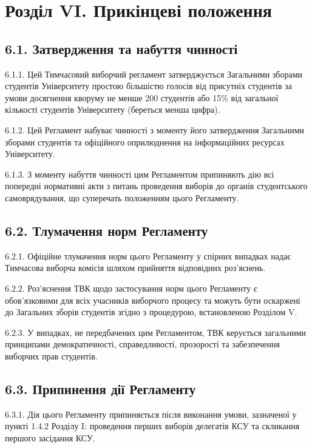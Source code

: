 \section*{Розділ VI. Прикінцеві положення}

\subsection*{6.1. Затвердження та набуття чинності}
    6.1.1. Цей Тимчасовий виборчий регламент затверджується Загальними зборами студентів Університету простою більшістю голосів від присутніх студентів за умови досягнення кворуму не менше 200 студентів або 15\% від загальної кількості студентів Університету (береться менша цифра).

    6.1.2. Цей Регламент набуває чинності з моменту його затвердження Загальними зборами студентів та офіційного оприлюднення на інформаційних ресурсах Університету.

    6.1.3. З моменту набуття чинності цим Регламентом припиняють дію всі попередні нормативні акти з питань проведення виборів до органів студентського самоврядування, що суперечать положенням цього Регламенту.

\subsection*{6.2. Тлумачення норм Регламенту}
    6.2.1. Офіційне тлумачення норм цього Регламенту у спірних випадках надає Тимчасова виборча комісія шляхом прийняття відповідних роз'яснень.

    6.2.2. Роз'яснення ТВК щодо застосування норм цього Регламенту є обов'язковими для всіх учасників виборчого процесу та можуть бути оскаржені до Загальних зборів студентів згідно з процедурою, встановленою Розділом V.

    6.2.3. У випадках, не передбачених цим Регламентом, ТВК керується загальними принципами демократичності, справедливості, прозорості та забезпечення виборчих прав студентів.

\subsection*{6.3. Припинення дії Регламенту}
    6.3.1. Дія цього Регламенту припиняється після виконання умови, зазначеної у пункті 1.4.2 Розділу I: проведення перших виборів делегатів КСУ та скликання першого засідання КСУ.

